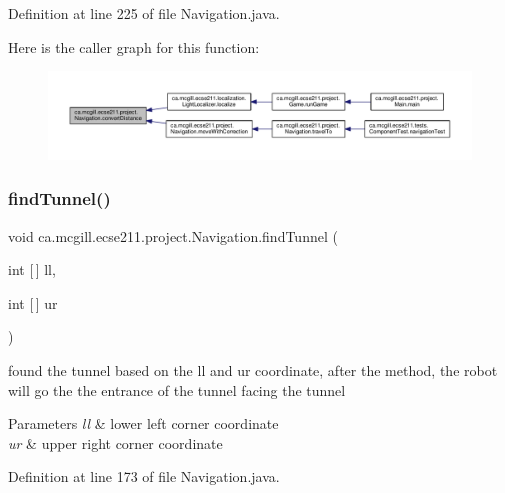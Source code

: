 Definition at line 225 of file Navigation.\+java.

Here is the caller graph for this function\+:
\nopagebreak
\begin{figure}[H]
\begin{center}
\leavevmode
\includegraphics[width=350pt]{classca_1_1mcgill_1_1ecse211_1_1project_1_1_navigation_ac9e260bcd619ffa4820d7d0de7ea1c12_icgraph}
\end{center}
\end{figure}
\mbox{\label{classca_1_1mcgill_1_1ecse211_1_1project_1_1_navigation_ae0588f4dbf493a982171b8e7814bff37}} 
\subsubsection{\texorpdfstring{find\+Tunnel()}{findTunnel()}}
{\footnotesize\ttfamily void ca.\+mcgill.\+ecse211.\+project.\+Navigation.\+find\+Tunnel (\begin{DoxyParamCaption}\item[{int \mbox{[}$\,$\mbox{]}}]{ll,  }\item[{int \mbox{[}$\,$\mbox{]}}]{ur }\end{DoxyParamCaption})}

found the tunnel based on the ll and ur coordinate, after the method, the robot will go the the entrance of the tunnel facing the tunnel 
\begin{DoxyParams}{Parameters}
{\em ll} & lower left corner coordinate \\
\hline
{\em ur} & upper right corner coordinate \\
\hline
\end{DoxyParams}


Definition at line 173 of file Navigation.\+java.

\mbox{\label{classca_1_1mcgill_1_1ecse211_1_1project_1_1_navigation_a4b52e605d3ea2f9bcd9481ae2c69ba39}} 
